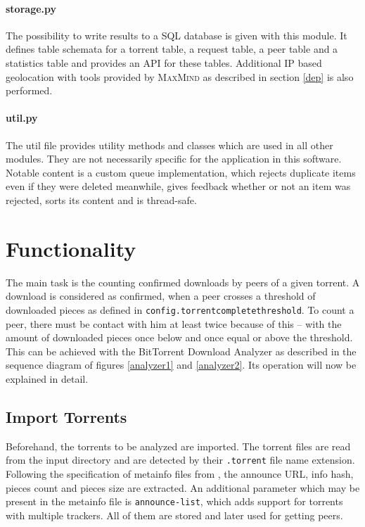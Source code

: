 \documentclass[10pt, a4paper, twoside, headsepline]{scrbook}
\renewcommand{\_}{\origunderscore\allowbreak}
\newcommand{\config}[1]{\texttt{config.\allowbreak #1}}
\begin{document}
\paragraph{storage.py} The possibility to write results to a SQL database is given with this module. It defines table schemata for a torrent table, a request table, a peer table and a statistics table and provides an API for these tables. Additional IP based geolocation with tools provided by \textsc{MaxMind} as described in section \ref{dep} is also performed.

\paragraph{util.py} The util file provides utility methods and classes which are used in all other modules. They are not necessarily specific for the application in this software. Notable content is a custom queue implementation, which rejects duplicate items even if they were deleted meanwhile, gives feedback whether or not an item was rejected, sorts its content and is thread-safe.

\section{Functionality}
\label{func}
The main task is the counting confirmed downloads by peers of a given torrent. A download is considered as confirmed, when a peer crosses a threshold of downloaded pieces as defined in \config{torrent\_complete\_threshold}. To count a peer, there must be contact with him at least twice because of this -- with the amount of downloaded pieces once below and once equal or above the threshold. This can be achieved with the BitTorrent Download Analyzer as described in the sequence diagram of figures \ref{analyzer1} and \ref{analyzer2}. Its operation will now be explained in detail.

\subsection{Import Torrents}
Beforehand, the torrents to be analyzed are imported. The torrent files are read from the input directory and are detected by their \texttt{.torrent} file name extension. Following the specification of metainfo files from \cite{bep3}, the announce URL, info hash, pieces count and pieces size are extracted. An additional parameter which may be present in the metainfo file is \texttt{announce-list}, which adds support for torrents with multiple trackers. All of them are stored and later used for getting peers.
\end{document}
